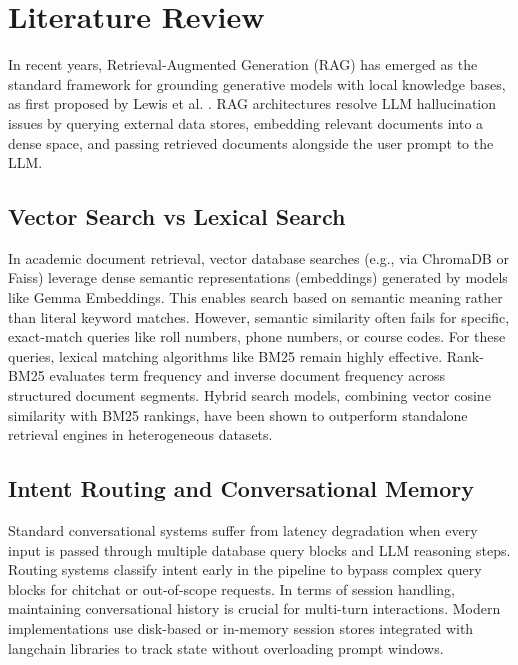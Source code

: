 \documentclass[12pt,a4paper]{article}
\begin{document}
\newpage
\section{Literature Review}
In recent years, Retrieval-Augmented Generation (RAG) has emerged as the standard framework for grounding generative models with local knowledge bases, as first proposed by Lewis et al. \cite{lewis2020rag}. RAG architectures resolve LLM hallucination issues by querying external data stores, embedding relevant documents into a dense space, and passing retrieved documents alongside the user prompt to the LLM. 

\subsection{Vector Search vs Lexical Search}
In academic document retrieval, vector database searches (e.g., via ChromaDB or Faiss) leverage dense semantic representations (embeddings) generated by models like Gemma Embeddings. This enables search based on semantic meaning rather than literal keyword matches. However, semantic similarity often fails for specific, exact-match queries like roll numbers, phone numbers, or course codes. For these queries, lexical matching algorithms like BM25 \cite{robertson2009bm25} remain highly effective. Rank-BM25 evaluates term frequency and inverse document frequency across structured document segments. Hybrid search models, combining vector cosine similarity with BM25 rankings, have been shown to outperform standalone retrieval engines in heterogeneous datasets.

\subsection{Intent Routing and Conversational Memory}
Standard conversational systems suffer from latency degradation when every input is passed through multiple database query blocks and LLM reasoning steps. Routing systems classify intent early in the pipeline to bypass complex query blocks for chitchat or out-of-scope requests. In terms of session handling, maintaining conversational history is crucial for multi-turn interactions. Modern implementations use disk-based or in-memory session stores integrated with langchain libraries to track state without overloading prompt windows.
\end{document}
